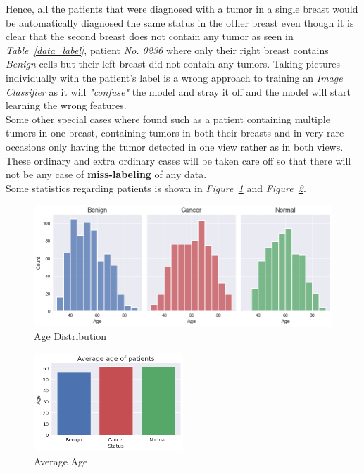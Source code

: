 \documentclass[12pt]{extarticle}
\begin{document}
	Hence, all the patients that were diagnosed with a tumor in a single breast would be automatically diagnosed the same status in the other breast even though it is clear that the second breast does not contain any tumor as seen in \emph{Table~\ref{data_label}}, patient \emph{No. 0236} where only their right breast contains \emph{Benign} cells but their left breast did not contain any tumors. Taking pictures individually with the patient's label is a wrong approach to training an \emph{Image Classifier} as it will \emph{"confuse"} the model and stray it off and the model will start learning the wrong features.\\[5mm]
	Some other special cases where found such as a patient containing multiple tumors in one breast, containing tumors in both their breasts and in very rare occasions only having the tumor detected in one view rather as in both views.\\[5mm]
	These ordinary and extra ordinary cases will be taken care off so that there will not be any case of \textbf{miss-labeling} of any data.\\[5mm]
	Some statistics regarding patients is shown in \emph{Figure~\ref{fig:Age_Dist}} and \emph{Figure~\ref{fig:Avg_Age}}.
	
	\begin{figure}[h]
		\centering
		\includegraphics[width=1\textwidth]{pics/Figures/Age_Dist.png}
		\caption{\small{Age Distribution}}
		\label{fig:Age_Dist}
	\end{figure}
	\begin{figure}[h]
		\centering
		\includegraphics[width=0.5\textwidth]{pics/Figures/Avg_Age.png}
		\caption{\small{Average Age}}
		\label{fig:Avg_Age}
	\end{figure}
	\newpage	
\end{document}
